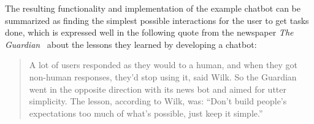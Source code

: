 The resulting functionality and implementation of the example chatbot can be summarized as finding the simplest possible interactions for the user to get tasks done, which is expressed well in the following quote from the newspaper \emph{The Guardian}~\cite{digiday} about the lessons they learned by developing a chatbot:

\begin{quote}
A lot of users responded as they would to a human, and when they got non-human responses, they’d stop using it, said Wilk. So the Guardian went in the opposite direction with its news bot and aimed for utter simplicity. The lesson, according to Wilk, was: “Don’t build people’s expectations too much of what’s possible, just keep it simple.”
\end{quote}
